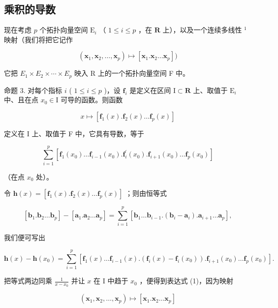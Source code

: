 \subsection{乘积的导数}

现在考虑 \(p\) 个拓扑向量空间 \(\mathrm{E}_i\) （ \(1 \leqslant i \leqslant p\) ，在 \(\mathbf{R}\) 上），以及一个连续多线性 \(^1\) 映射（我们将把它记作

\[
\left(\mathbf {x} _ {1}, \mathbf {x} _ {2}, \dots , \mathbf {x} _ {p}\right) \mapsto \left[ \mathbf {x} _ {1}. \mathbf {x} _ {2} \dots \mathbf {x} _ {p} \right])
\]

它把 \(E_{1} \times E_{2} \times \cdots \times E_{p}\) 映入 R 上的一个拓扑向量空间 F 中。

命题 3. 对每个指标 \(i\) ( \(1 \leqslant i \leqslant p\) )，设 \(\mathbf{f}_i\) 是定义在区间 \(\mathrm{I} \subset \mathbf{R}\) 上、取值于 \(\mathrm{E}_i\) 中、且在点 \(x_0 \in \mathrm{I}\) 可导的函数。则函数

\[
x \mapsto [ \mathbf {f} _ {1} (x). \mathbf {f} _ {2} (x) \dots \mathbf {f} _ {p} (x) ]
\]

定义在 I 上、取值于 F 中，它具有导数，等于

\[
\sum_ {i = 1} ^ {p} \left[ \mathbf {f} _ {1} (x _ {0}) \dots \mathbf {f} _ {i - 1} (x _ {0}). \mathbf {f} _ {i} ^ {\prime} (x _ {0}). \mathbf {f} _ {i + 1} (x _ {0}) \dots \mathbf {f} _ {p} (x _ {0}) \right]\tag{1}
\]

（在点 \(x_0\) 处）。

令 \(\mathbf{h}(x) = [\mathbf{f}_1(x).\mathbf{f}_2(x)\dots \mathbf{f}_p(x)]\) ；则由恒等式

\[
\left[ \mathbf {b} _ {1}. \mathbf {b} _ {2} \dots \mathbf {b} _ {p} \right] - \left[ \mathbf {a} _ {1}. \mathbf {a} _ {2} \dots \mathbf {a} _ {p} \right] = \sum_ {i = 1} ^ {p} \left[ \mathbf {b} _ {1} \dots \mathbf {b} _ {i - 1}. (\mathbf {b} _ {i} - \mathbf {a} _ {i}). \mathbf {a} _ {i + 1} \dots \mathbf {a} _ {p} \right],
\]

我们便可写出

\[
\mathbf {h} (x) - \mathbf {h} (x _ {0}) = \sum_ {i = 1} ^ {p} \left[ \mathbf {f} _ {1} (x) \dots \mathbf {f} _ {i - 1} (x). (\mathbf {f} _ {i} (x) - \mathbf {f} _ {i} (x _ {0})). \mathbf {f} _ {i + 1} (x _ {0}) \dots \mathbf {f} _ {p} (x _ {0}) \right].
\]

把等式两边同乘 \(\frac{1}{x - x_0}\) 并让 \(x\) 在 I 中趋于 \(x_0\) ，便得到表达式 (1)，因为映射

\[
(\mathbf {x} _ {1}, \mathbf {x} _ {2}, \dots , \mathbf {x} _ {p}) \mapsto [ \mathbf {x} _ {1}. \mathbf {x} _ {2} \dots \mathbf {x} _ {p} ]
\]

